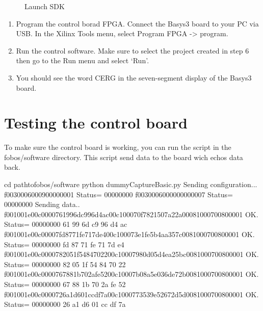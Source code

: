 \documentclass[letterpaper,10pt,english]{sphinxmanual}
\begin{document}
\begin{figure}[htbp]
\centering
\capstart

\noindent{}
\caption{Launch SDK}\label{\detokenize{setup:id5}}\end{figure}
\begin{enumerate}
%
\setcounter{enumi}{7}
\item {} 
Program the control borad FPGA. Connect the Basys3 board to your PC via USB. In the Xilinx Tools menu, select Program FPGA -\textgreater{} program.

\item {} 
Run the control software. Make sure to select the  project created in step 6 then go to the Run menu and select ‘Run’.

\item {} 
You should see the word CERG in the seven-segment display of the Basys3 board.

\end{enumerate}


\section{Testing the control board}
\label{\detokenize{setup:testing-the-control-board}}
To make sure the control board is working, you can run the  script in the fobos/software directory.
This script send data to the board wich echos data back.

\begin{sphinxVerbatim}[commandchars=\\\{\}]
\PYGZdl{} cd path\PYGZhy{}to\PYGZhy{}fobos/software
\PYGZdl{} python dummyCaptureBasic.py
Sending configuration...
f0030006000900000001
Status= 00000000
f0030006000000000007
Status= 00000000
Sending data..
f001001e00c0000761996dc996d4ac00c100070f7821507a22a00081000700800001
OK.    Status= 00000000
61 99 6d c9 96 d4 ac
f001001e00c00007fd8771fe717de400c100073e1fe5b4aa357c0081000700800001
OK.    Status= 00000000
fd 87 71 fe 71 7d e4
f001001e00c0000782051f5484702200c10007980d05d4ea25bc0081000700800001
OK.    Status= 00000000
82 05 1f 54 84 70 22
f001001e00c0000767881b702afe5200c10007b08a5e036de72b0081000700800001
OK.    Status= 00000000
67 88 1b 70 2a fe 52
f001001e00c0000726a1d601ccdf7a00c1000773539e52672d5d0081000700800001
OK.    Status= 00000000
26 a1 d6 01 cc df 7a
\end{sphinxVerbatim}
\end{document}

